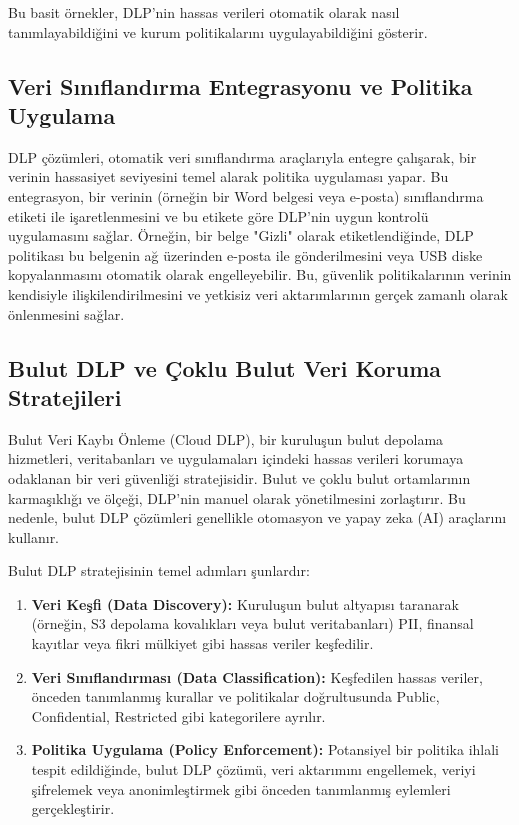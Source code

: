 Bu basit örnekler, DLP'nin hassas verileri otomatik olarak nasıl tanımlayabildiğini ve kurum politikalarını uygulayabildiğini gösterir.

\subsection{Veri Sınıflandırma Entegrasyonu ve Politika Uygulama}

DLP çözümleri, otomatik veri sınıflandırma araçlarıyla entegre çalışarak, bir verinin hassasiyet seviyesini temel alarak politika uygulaması yapar. Bu entegrasyon, bir verinin (örneğin bir Word belgesi veya e-posta) sınıflandırma etiketi ile işaretlenmesini ve bu etikete göre DLP'nin uygun kontrolü uygulamasını sağlar. Örneğin, bir belge "Gizli" olarak etiketlendiğinde, DLP politikası bu belgenin ağ üzerinden e-posta ile gönderilmesini veya USB diske kopyalanmasını otomatik olarak engelleyebilir. Bu, güvenlik politikalarının verinin kendisiyle ilişkilendirilmesini ve yetkisiz veri aktarımlarının gerçek zamanlı olarak önlenmesini sağlar.

\subsection{Bulut DLP ve Çoklu Bulut Veri Koruma Stratejileri}

Bulut Veri Kaybı Önleme (Cloud DLP), bir kuruluşun bulut depolama hizmetleri, veritabanları ve uygulamaları içindeki hassas verileri korumaya odaklanan bir veri güvenliği stratejisidir. Bulut ve çoklu bulut ortamlarının karmaşıklığı ve ölçeği, DLP'nin manuel olarak yönetilmesini zorlaştırır. Bu nedenle, bulut DLP çözümleri genellikle otomasyon ve yapay zeka (AI) araçlarını kullanır.

Bulut DLP stratejisinin temel adımları şunlardır:

\begin{enumerate}
    \item \textbf{Veri Keşfi (Data Discovery):} Kuruluşun bulut altyapısı taranarak (örneğin, S3 depolama kovalıkları veya bulut veritabanları) PII, finansal kayıtlar veya fikri mülkiyet gibi hassas veriler keşfedilir.
    \item \textbf{Veri Sınıflandırması (Data Classification):} Keşfedilen hassas veriler, önceden tanımlanmış kurallar ve politikalar doğrultusunda Public, Confidential, Restricted gibi kategorilere ayrılır.
    \item \textbf{Politika Uygulama (Policy Enforcement):} Potansiyel bir politika ihlali tespit edildiğinde, bulut DLP çözümü, veri aktarımını engellemek, veriyi şifrelemek veya anonimleştirmek gibi önceden tanımlanmış eylemleri gerçekleştirir.
\end{enumerate}

